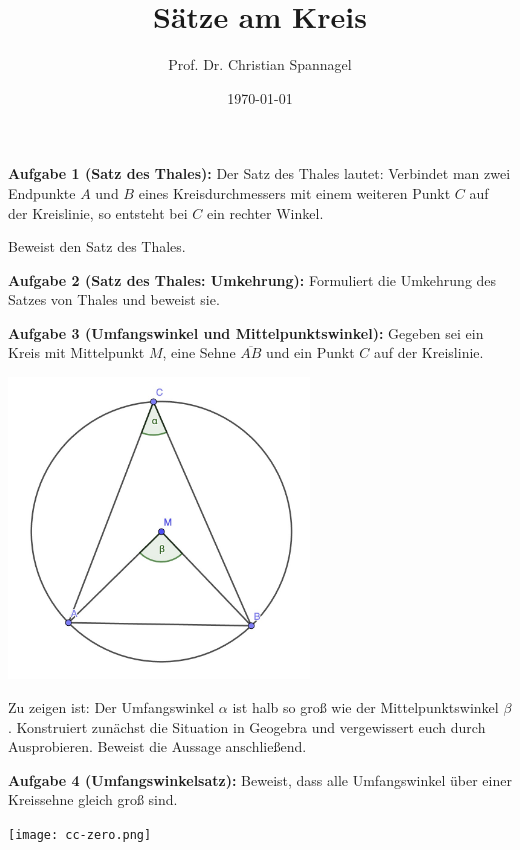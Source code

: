 \documentclass[12pt,a4paper,oneside,ngerman]{article}
\title{Sätze am Kreis}
\author{Prof. Dr. Christian Spannagel}
\date{\today}
\begin{document}
\pagestyle{fancy}
\begin{center}
{\LARGE\textbf{\thetitle}}
\end{center}

\textbf{Aufgabe 1 (Satz des Thales):}  Der Satz des Thales lautet: Verbindet man zwei Endpunkte $A$ und $B$ eines Kreisdurchmessers mit einem weiteren Punkt $C$ auf der Kreislinie, so entsteht bei $C$ ein rechter Winkel.

Beweist den Satz des Thales.

\textbf{Aufgabe 2 (Satz des Thales: Umkehrung):} Formuliert die Umkehrung des Satzes von Thales und beweist sie.

\textbf{Aufgabe 3 (Umfangswinkel und Mittelpunktswinkel):} Gegeben sei ein Kreis mit Mittelpunkt $M$, eine Sehne $\overline{AB}$ und ein Punkt $C$ auf der Kreislinie. 
\begin{center}
\includegraphics[width=8cm]{umfangswinkel.png}
\end{center}
Zu zeigen ist: Der Umfangswinkel $\alpha$ ist halb so groß wie der Mittelpunktswinkel $\beta$. Konstruiert zunächst die Situation in Geogebra und vergewissert euch durch Ausprobieren. Beweist die Aussage anschließend.

\textbf{Aufgabe 4 (Umfangswinkelsatz):}  Beweist, dass alle Umfangswinkel über einer Kreissehne gleich groß sind.


\vspace*{10mm}
\texttt{[image: cc-zero.png]}
\end{document}
